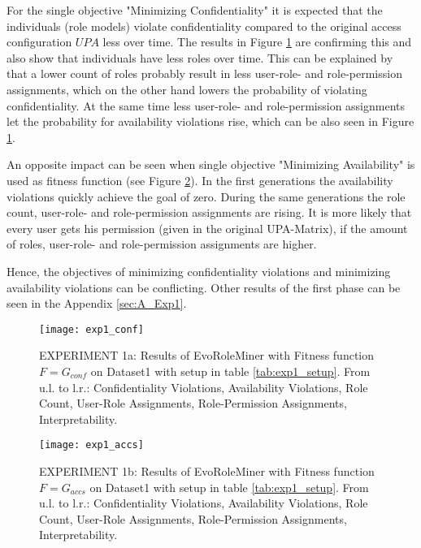For the single objective "Minimizing Confidentiality" it is expected that the individuals (role models) violate confidentiality compared to the original access configuration $UPA$ less over time. The results in Figure \ref{fig:exp1_conf} are confirming this and also show that individuals have less roles over time. This can be explained by that a lower count of roles probably result in less user-role- and role-permission assignments, which on the other hand lowers the probability of violating confidentiality. At the same time less user-role- and role-permission assignments let the probability for availability violations rise, which can be also seen in Figure \ref{fig:exp1_conf}.

An opposite impact can be seen when single objective "Minimizing Availability" is used as fitness function (see Figure \ref{fig:exp1_accs}). In the first generations the availability violations quickly achieve the goal of zero. During the same generations the role count, user-role- and role-permission assignments are rising. It is more likely that every user gets his permission (given in the original UPA-Matrix), if the amount of roles, user-role- and role-permission assignments are higher.

Hence, the objectives of minimizing confidentiality violations and minimizing availability violations can be conflicting. Other results of the first phase can be seen in the Appendix \ref{sec:A_Exp1}.

\begin{figure}[H]
    \centering
    \texttt{[image: exp1\_conf]}
    \caption{EXPERIMENT 1a: Results of EvoRoleMiner with Fitness function $F=G_{conf}$ on Dataset1 with setup in table \ref{tab:exp1_setup}. From u.l. to l.r.: Confidentiality Violations, Availability Violations, Role Count, User-Role Assignments, Role-Permission Assignments, Interpretability.}
    \label{fig:exp1_conf}
\end{figure}

\begin{figure}[H]
    \centering
    \texttt{[image: exp1\_accs]}
    \caption{EXPERIMENT 1b: Results of EvoRoleMiner with Fitness function $F=G_{accs}$ on Dataset1 with setup in table \ref{tab:exp1_setup}. From u.l. to l.r.: Confidentiality Violations, Availability Violations, Role Count, User-Role Assignments, Role-Permission Assignments, Interpretability.}
    \label{fig:exp1_accs}
\end{figure}